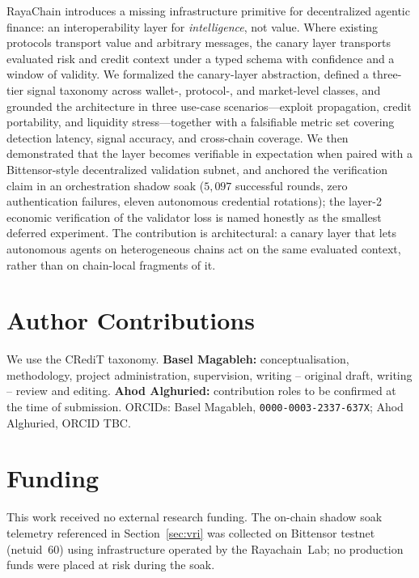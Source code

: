 \documentclass[journal]{IEEEtran}
\begin{document}
RayaChain introduces a missing infrastructure primitive for
decentralized agentic finance: an interoperability layer for
\emph{intelligence}, not value. Where existing protocols transport
value and arbitrary messages, the canary layer transports evaluated
risk and credit context under a typed schema with confidence and a
window of validity. We formalized the canary-layer abstraction,
defined a three-tier signal taxonomy across wallet-, protocol-, and
market-level classes, and grounded the architecture in three
use-case scenarios---exploit propagation, credit portability, and
liquidity stress---together with a falsifiable metric set covering
detection latency, signal accuracy, and cross-chain coverage. We
then demonstrated that the layer becomes verifiable in expectation
when paired with a Bittensor-style decentralized validation subnet,
and anchored the verification claim in an orchestration shadow soak
($5{,}097$ successful rounds, zero authentication failures, eleven
autonomous credential rotations); the layer-2 economic verification
of the validator loss is named honestly as the smallest deferred
experiment. The contribution is architectural: a canary layer that
lets autonomous agents on heterogeneous chains act on the same
evaluated context, rather than on chain-local fragments of it.

\section*{Author Contributions}

We use the CRediT taxonomy. \textbf{Basel Magableh:}
conceptualisation, methodology, project administration, supervision,
writing -- original draft, writing -- review and editing.
\textbf{Ahod Alghuried:} contribution roles to be confirmed at the
time of submission. ORCIDs: Basel Magableh,
\texttt{0000-0003-2337-637X}; Ahod Alghuried, ORCID TBC.

\section*{Funding}

This work received no external research funding. The on-chain shadow
soak telemetry referenced in Section~\ref{sec:vri} was collected on
Bittensor testnet (netuid~60) using infrastructure operated by the
Rayachain~Lab; no production funds were placed at risk during the
soak.
\end{document}
